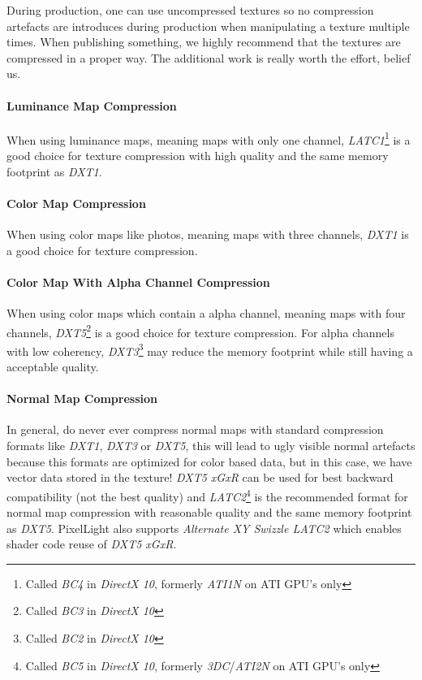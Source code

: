 During production, one can use uncompressed textures so no compression artefacts are introduces during production when manipulating a texture multiple times. When publishing something, we highly recommend that the textures are compressed in a proper way. The additional work is really worth the effort, belief us.


\paragraph{Luminance Map Compression}
When using luminance maps, meaning maps with only one channel, \emph{LATC1}\footnote{Called \emph{BC4} in \emph{DirectX 10}, formerly \emph{ATI1N} on ATI GPU's only} is a good choice for texture compression with high quality and the same memory footprint as \emph{DXT1}.


\paragraph{Color Map Compression}
When using color maps like photos, meaning maps with three channels, \emph{DXT1} is a good choice for texture compression.


\paragraph{Color Map With Alpha Channel Compression}
When using color maps which contain a alpha channel, meaning maps with four channels, \emph{DXT5}\footnote{Called \emph{BC3} in \emph{DirectX 10}} is a good choice for texture compression. For alpha channels with low coherency, \emph{DXT3}\footnote{Called \emph{BC2} in \emph{DirectX 10}} may reduce the memory footprint while still having a acceptable quality.


\paragraph{Normal Map Compression}
In general, do never ever compress normal maps with standard compression formats like \emph{DXT1}, \emph{DXT3} or \emph{DXT5}, this will lead to ugly visible normal artefacts because this formats are optimized for color based data, but in this case, we have vector data stored in the texture! \emph{DXT5 xGxR} can be used for best backward compatibility (not the best quality) and \emph{LATC2}\footnote{Called \emph{BC5} in \emph{DirectX 10}, formerly \emph{3DC}/\emph{ATI2N} on ATI GPU's only} is the recommended format for normal map compression with reasonable quality and the same memory footprint as \emph{DXT5}. PixelLight also supports \emph{Alternate XY Swizzle LATC2} which enables shader code reuse of \emph{DXT5 xGxR}.

